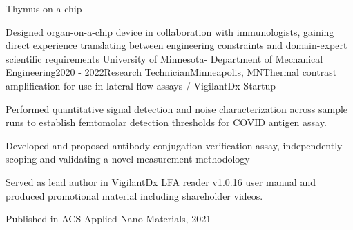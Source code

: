       {Thymus-on-a-chip}
  \resumeItemListStart
    \item{Designed organ-on-a-chip device in collaboration with immunologists, gaining direct experience translating between engineering constraints and domain-expert scientific requirements}
    \resumeItemListEnd
        \resumeJob
      {University of Minnesota- Department of Mechanical Engineering}{2020 - 2022}{Research Technician}{Minneapolis, MN}{Thermal contrast amplification for use in lateral flow assays / VigilantDx Startup}
      \resumeItemListStart
     \item{Performed quantitative signal detection and noise characterization across sample runs to establish femtomolar detection thresholds for COVID antigen assay.}
    \item{Developed and proposed antibody conjugation verification assay, independently scoping and validating a novel measurement methodology}
    \item {Served as lead author in VigilantDx LFA reader v1.0.16 user manual and produced promotional material including shareholder videos.}
    \item{Published in ACS Applied Nano Materials, 2021}
        \resumeItemListEnd
    \resumeSubHeadingListEnd

